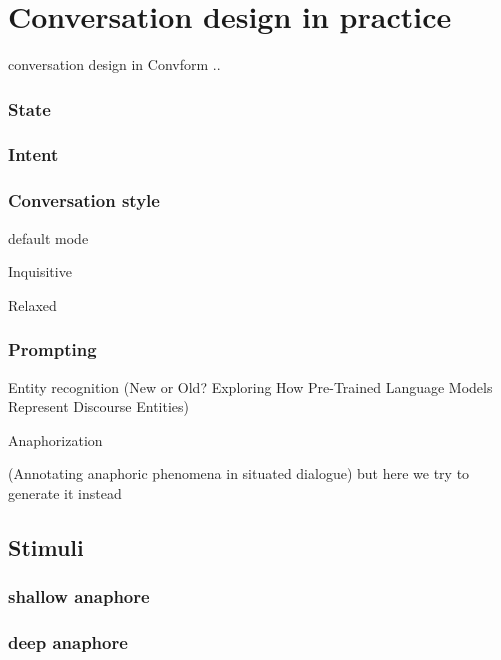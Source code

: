 \documentclass[12pt]{report}
\begin{document}
{\section{Conversation design in practice}

\par
conversation design in Convform ..

\subsubsection{State}

\subsubsection{Intent}

\subsubsection{Conversation style}

\par
default mode

\par
Inquisitive

\par
Relaxed

\subsubsection{Prompting}

\par
Entity recognition
(New or Old? Exploring How Pre-Trained Language Models Represent Discourse Entities)

\par
Anaphorization

(Annotating anaphoric phenomena in situated dialogue) but here we try to generate it instead


\subsection{Stimuli}

\subsubsection{shallow anaphore}

\subsubsection{deep anaphore}

}
\end{document}
